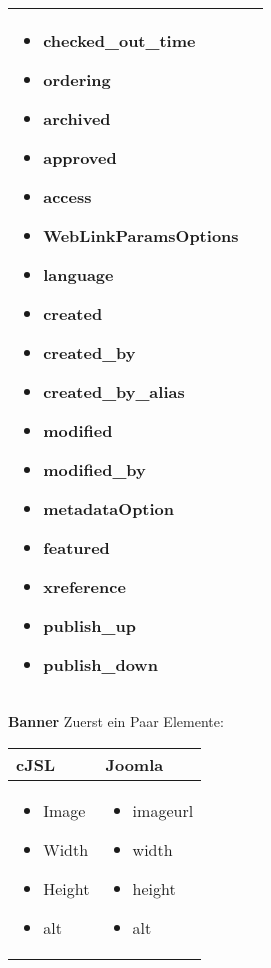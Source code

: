 \begin{minipage}{0.7\textwidth}
\begin{tabular}{|p{} | p{}|}
\begin{itemize}
\item   checked\_out\_time
\item   ordering
\item   archived
\item   approved
\item   access
\item   WebLinkParamsOptions
\item   language
\item   created
\item   created\_by
\item   created\_by\_alias
\item   modified
\item   modified\_by
\item   metadataOption
\item   featured
\item   xreference
\item   publish\_up
\item   publish\_down 
\end{itemize}
\\
\hline
\end{tabular}
\end{minipage}

\textbf{Banner}
Zuerst ein Paar Elemente:

\begin{minipage}{0.7\textwidth}
\begin{tabular}{|p{} | p{}|}
\hline
\textbf{cJSL} & \textbf{Joomla} \\ 
\hline
\begin{itemize}
\item Image
\item Width
\item Height
\item alt
\end{itemize}
 & 
\begin{itemize}
\item imageurl
\item width
\item height
\item alt
\end{itemize}
\\
\hline
\end{tabular}
\end{minipage}

